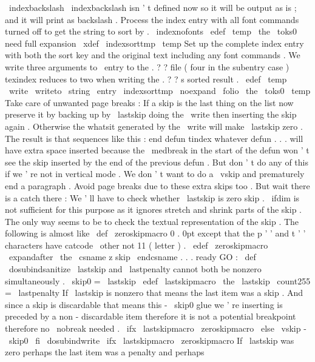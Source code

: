 {{{{
\
indexbackslash
}
%
\
indexbackslash
isn
'
t
defined
now
%
so
it
will
be
output
as
is
;
and
it
will
print
as
backslash
.
%
%
Process
the
index
entry
with
all
font
commands
turned
off
to
%
get
the
string
to
sort
by
.
{
\
indexnofonts
\
edef
\
temp
{
\
the
\
toks0
}
%
need
full
expansion
\
xdef
\
indexsorttmp
{
\
temp
}
%
}
%
%
%
Set
up
the
complete
index
entry
with
both
the
sort
key
and
%
the
original
text
including
any
font
commands
.
We
write
%
three
arguments
to
\
entry
to
the
.
?
?
file
(
four
in
the
%
subentry
case
)
texindex
reduces
to
two
when
writing
the
.
?
?
s
%
sorted
result
.
\
edef
\
temp
{
%
\
write
\
writeto
{
%
\
string
\
entry
{
\
indexsorttmp
}
{
\
noexpand
\
folio
}
{
\
the
\
toks0
}
}
%
}
%
\
temp
}
%
Take
care
of
unwanted
page
breaks
:
%
%
If
a
skip
is
the
last
thing
on
the
list
now
preserve
it
%
by
backing
up
by
\
lastskip
doing
the
\
write
then
inserting
%
the
skip
again
.
Otherwise
the
whatsit
generated
by
the
%
\
write
will
make
\
lastskip
zero
.
The
result
is
that
sequences
%
like
this
:
%
end
defun
%
tindex
whatever
%
defun
.
.
.
%
will
have
extra
space
inserted
because
the
\
medbreak
in
the
%
start
of
the
defun
won
'
t
see
the
skip
inserted
by
the
end
of
%
the
previous
defun
.
%
%
But
don
'
t
do
any
of
this
if
we
'
re
not
in
vertical
mode
.
We
%
don
'
t
want
to
do
a
\
vskip
and
prematurely
end
a
paragraph
.
%
%
Avoid
page
breaks
due
to
these
extra
skips
too
.
%
%
But
wait
there
is
a
catch
there
:
%
We
'
ll
have
to
check
whether
\
lastskip
is
zero
skip
.
\
ifdim
is
not
%
sufficient
for
this
purpose
as
it
ignores
stretch
and
shrink
parts
%
of
the
skip
.
The
only
way
seems
to
be
to
check
the
textual
%
representation
of
the
skip
.
%
%
The
following
is
almost
like
\
def
\
zeroskipmacro
{
0
.
0pt
}
except
that
%
the
p
'
'
and
t
'
'
characters
have
catcode
\
other
not
11
(
letter
)
.
%
\
edef
\
zeroskipmacro
{
\
expandafter
\
the
\
csname
z
skip
\
endcsname
}
%
%
.
.
.
ready
GO
:
%
\
def
\
dosubindsanitize
{
%
%
\
lastskip
and
\
lastpenalty
cannot
both
be
nonzero
simultaneously
.
\
skip0
=
\
lastskip
\
edef
\
lastskipmacro
{
\
the
\
lastskip
}
%
\
count255
=
\
lastpenalty
%
%
If
\
lastskip
is
nonzero
that
means
the
last
item
was
a
%
skip
.
And
since
a
skip
is
discardable
that
means
this
%
-
\
skip0
glue
we
'
re
inserting
is
preceded
by
a
%
non
-
discardable
item
therefore
it
is
not
a
potential
%
breakpoint
therefore
no
\
nobreak
needed
.
\
ifx
\
lastskipmacro
\
zeroskipmacro
\
else
\
vskip
-
\
skip0
\
fi
%
\
dosubindwrite
%
\
ifx
\
lastskipmacro
\
zeroskipmacro
%
If
\
lastskip
was
zero
perhaps
the
last
item
was
a
penalty
and
%
perhaps
}}}

